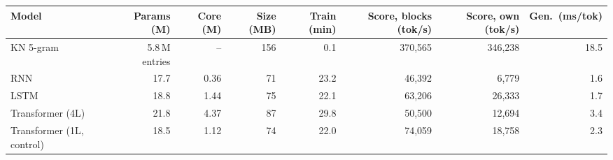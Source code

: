 \begin{tabular}{@{}lrrrrrrr@{}}
\toprule
Model & Params (M) & Core (M) & Size (MB) & Train (min) & Score, blocks (tok/s) & Score, own (tok/s) & Gen.\ (ms/tok) \\
\midrule
KN 5-gram & 5.8\,M entries & -- & 156 & 0.1 & 370,565 & 346,238 & 18.5 \\
RNN & 17.7 & 0.36 & 71 & 23.2 & 46,392 & 6,779 & 1.6 \\
LSTM & 18.8 & 1.44 & 75 & 22.1 & 63,206 & 26,333 & 1.7 \\
Transformer (4L) & 21.8 & 4.37 & 87 & 29.8 & 50,500 & 12,694 & 3.4 \\
Transformer (1L, control) & 18.5 & 1.12 & 74 & 22.0 & 74,059 & 18,758 & 2.3 \\
\bottomrule
\end{tabular}